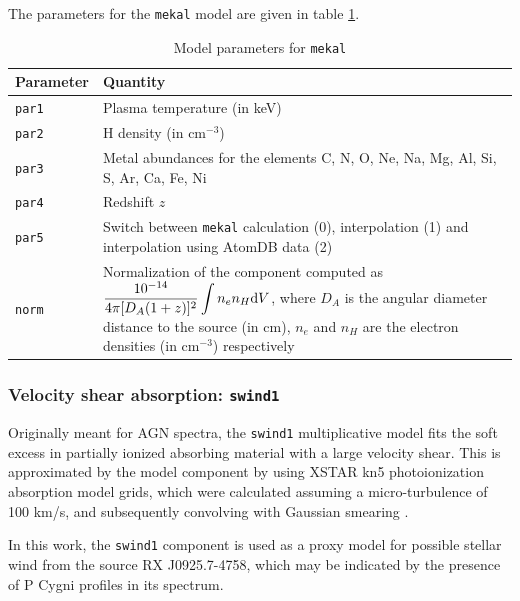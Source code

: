 				The parameters for the \texttt{mekal} model are given in table \ref{param:mekal}.
				\begin{table}[h!]
					\centering
					\caption{Model parameters for \texttt{mekal}}
					\label{param:mekal}
					\begin{tabular}{|p{3cm}|p{10cm}|}
						\hline
						\textbf{Parameter} & \textbf{Quantity} \\ \hline
						{\texttt{par1}} & {Plasma temperature (in keV)} \\ \hline
						{\texttt{par2}} & {H density (in cm$^{-3}$)} \\ \hline
						{\texttt{par3}} & {Metal abundances for the elements C, N, O, Ne, Na, Mg, Al, Si, S, Ar, Ca, Fe, Ni} \\ \hline
						{\texttt{par4}} & {Redshift $z$} \\ \hline
						{\texttt{par5}} & {Switch between \texttt{mekal} calculation (0), interpolation (1) and interpolation using AtomDB data (2)} \\ \hline
						{\texttt{norm}} & {Normalization of the component computed as $\displaystyle\dfrac{10^{-14}}{4\pi[D_A(1+z)]^2}\int{n_en_H\mathrm{d}V}$, where $D_A$ is the angular diameter distance to the source (in cm), $n_e$ and $n_H$ are the electron densities (in cm$^{-3}$) respectively} \\ \hline
					\end{tabular}
				\end{table}
			
			\subsubsection{Velocity shear absorption: \texttt{swind1}}
				Originally meant for AGN spectra, the \texttt{swind1} multiplicative model fits the soft excess in partially ionized absorbing material with a large velocity shear. This is approximated by the model component by using XSTAR kn5 photoionization absorption model grids, which were calculated assuming a micro-turbulence of 100 km/s, and subsequently convolving with Gaussian smearing \cite{swind1}.
				
				In this work, the \texttt{swind1} component is used as a proxy model for possible stellar wind from the source RX J0925.7-4758, which may be indicated by the presence of P Cygni profiles in its spectrum.
				
